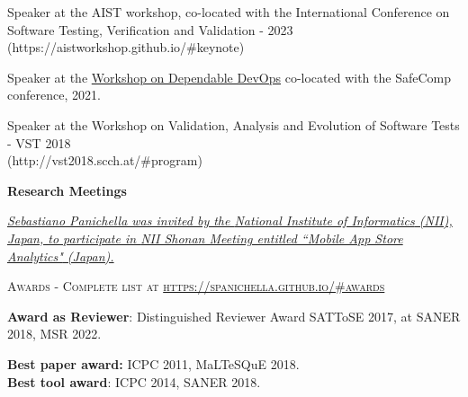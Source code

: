 \documentclass[11pt]{article}
\begin{document}
\begin{innerlist}
\item Speaker at the AIST workshop, co-located with the International Conference on Software Testing, Verification and Validation - 2023  \\(https://aistworkshop.github.io/\#keynote) 
\item Speaker at the \href{https://safecomp2021.hosted.york.ac.uk/wp-content/uploads/2021/08/DepDevOps_2021_programme.pdf}{Workshop on Dependable DevOps} co-located with the SafeComp conference, 2021.
\item Speaker at the Workshop on Validation, Analysis and Evolution of Software Tests - VST 2018  \\(http://vst2018.scch.at/\#program) 
\end{innerlist}
\medskip 
\textbf{Research Meetings}
\begin{innerlist}
   \item \emph{
              \href{http://www.nii.ac.jp/��}
                   {Sebastiano Panichella was invited by the \href{http://www.nii.ac.jp/}{National Institute of Informatics} (NII), Japan, to participate in \href{http://shonan.nii.ac.jp/shonan/}{NII Shonan Meeting entitled ``Mobile App Store Analytics"} (Japan).
}}


\end{innerlist}

\medskip\medskip\medskip

\vspace{-2.5mm}
\textsc{Awards - Complete list at \href{https://spanichella.github.io/\#awards}{https://spanichella.github.io/\#awards}}
\medskip

\textbf{Award as Reviewer}: Distinguished Reviewer Award SATToSE 2017, at SANER 2018, MSR 2022.


\textbf{Best paper award:} ICPC 2011, MaLTeSQuE 2018.\\ 
\textbf{Best tool award}: ICPC 2014, SANER 2018. 

\end{document}
